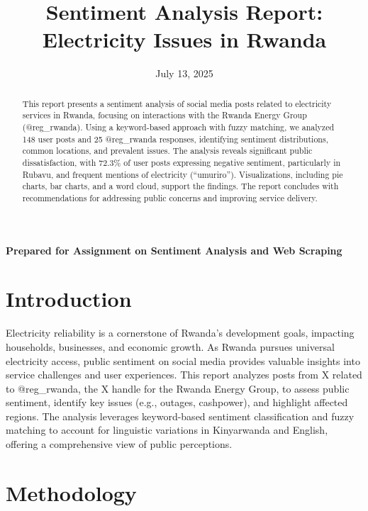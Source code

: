 \documentclass[a4paper,12pt]{article}
\title{Sentiment Analysis Report: Electricity Issues in Rwanda}
\author{}
\date{July 13, 2025}
\begin{document}
	
	\maketitle
	\begin{center}
		\vspace{0.5cm}
		\textbf{Prepared for Assignment on Sentiment Analysis and Web Scraping}
	\end{center}
	
	\newpage
	
	\begin{abstract}
		This report presents a sentiment analysis of social media posts related to electricity services in Rwanda, focusing on interactions with the Rwanda Energy Group (@reg\_rwanda). Using a keyword-based approach with fuzzy matching, we analyzed 148 user posts and 25 @reg\_rwanda responses, identifying sentiment distributions, common locations, and prevalent issues. The analysis reveals significant public dissatisfaction, with 72.3\% of user posts expressing negative sentiment, particularly in Rubavu, and frequent mentions of electricity (``umuriro''). Visualizations, including pie charts, bar charts, and a word cloud, support the findings. The report concludes with recommendations for addressing public concerns and improving service delivery.
	\end{abstract}
	
	\section{Introduction}
	Electricity reliability is a cornerstone of Rwanda's development goals, impacting households, businesses, and economic growth. As Rwanda pursues universal electricity access, public sentiment on social media provides valuable insights into service challenges and user experiences. This report analyzes posts from X related to @reg\_rwanda, the X handle for the Rwanda Energy Group, to assess public sentiment, identify key issues (e.g., outages, cashpower), and highlight affected regions. The analysis leverages keyword-based sentiment classification and fuzzy matching to account for linguistic variations in Kinyarwanda and English, offering a comprehensive view of public perceptions.
	
	\section{Methodology}
	
\end{document}
